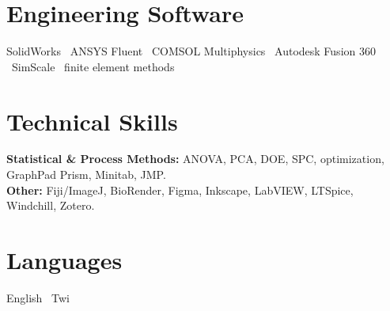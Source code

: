 \documentclass[10.5pt]{article}
\begin{document}
\section*{Engineering Software}
\noindent SolidWorks \textbullet\ ANSYS Fluent \textbullet\ COMSOL Multiphysics \textbullet\ Autodesk Fusion 360
\textbullet\ SimScale \textbullet\ finite element methods

\section*{Technical Skills}

\noindent \textbf{Statistical \& Process Methods:} ANOVA, PCA, DOE, SPC, optimization, GraphPad Prism, Minitab, JMP.\\[3pt]
\textbf{Other:} Fiji/ImageJ, BioRender, Figma, Inkscape, LabVIEW, LTSpice, Windchill, Zotero.

\section*{Languages}
\noindent English \textbullet\ Twi
\end{document}
